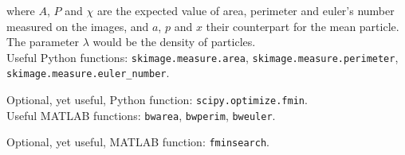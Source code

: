 \documentclass{article}
\begin{document}
where $A$, $P$ and $\chi$ are the expected value of area, perimeter and euler's number measured on the images, and $a$, $p$ and $x$ their counterpart for the mean particle. The parameter $\lambda$ would be the density of particles.\\



Useful Python functions: \texttt{skimage.measure.area}, \texttt{skimage.measure.perimeter}, \texttt{skimage.measure.euler\_number}.

Optional, yet useful, Python function: \texttt{scipy.optimize.fmin}.\\

Useful MATLAB functions: \texttt{bwarea}, \texttt{bwperim}, \texttt{bweuler}.

Optional, yet useful, MATLAB function: \texttt{fminsearch}.
\end{document}
